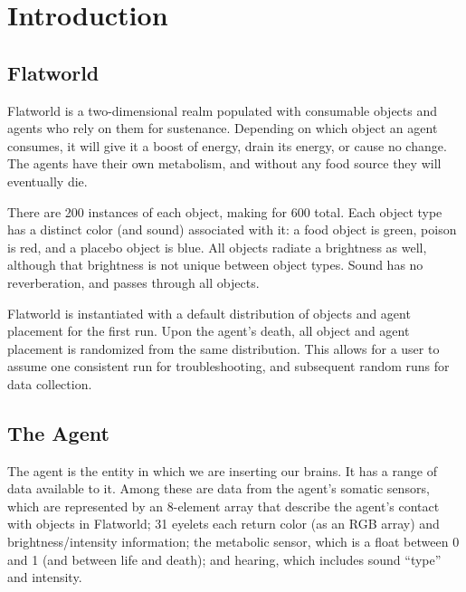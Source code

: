 \section{Introduction} \label{sec:Introduction}



\subsection{Flatworld}
Flatworld is a two-dimensional realm populated with consumable objects
and agents who rely on them for sustenance. Depending on which object
an agent consumes, it will give it a boost of energy, drain its energy,
or cause no change. The agents have their own metabolism, and without any food
source they will eventually die.

There are 200 instances of each object, making for 600 total. Each object type
has a distinct color (and sound) associated with it: a food object is green, 
poison is red, and a placebo object is blue. All objects radiate a brightness 
as well, although that brightness is not unique between object types. Sound 
has no reverberation, and passes through all objects.

Flatworld is instantiated with a default distribution of objects and agent
placement for the first run. Upon the agent's death, all object and agent
placement is randomized from the same distribution. This allows for a user
to assume one consistent run for troubleshooting, and subsequent random
runs for data collection.


\subsection{The Agent}
The agent is the entity in which we are inserting our brains. It has a range
of data available to it. Among these are data from the agent's somatic
sensors, which are represented by an 8-element array that describe the agent's
contact with objects in Flatworld; 31 eyelets each return color (as an RGB 
array) and brightness/intensity information; the metabolic sensor, which
is a float between 0 and 1 (and between life and death); and hearing, which
includes sound ``type'' and intensity.

